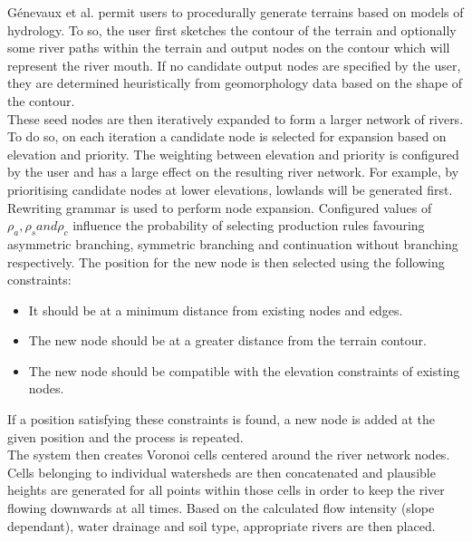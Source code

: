 Génevaux et al. \cite{Genevaux2013} permit users to procedurally generate terrains based on models of hydrology. To so, the user first sketches the contour of the terrain and optionally some river paths within the terrain and output nodes on the contour which will represent the river mouth. If no candidate output nodes are specified by the user, they are determined heuristically from geomorphology data based on the shape of the contour.\\
These seed nodes are then iteratively expanded to form a larger network of rivers. To do so, on each iteration a candidate node is selected for expansion based on elevation and priority. The weighting between elevation and priority is configured by the user and has a large effect on the resulting river network. For example, by prioritising candidate nodes at lower elevations, lowlands will be generated first.\\
Rewriting grammar is used to perform node expansion. Configured values of $\rho_{a}, \rho_{s} and \rho_{c}$ influence the probability of selecting production rules favouring asymmetric branching, symmetric branching and continuation without branching respectively. The position for the new node is then selected using the following constraints:
\begin{itemize}
\item It should be at a minimum distance from existing nodes and edges.
\item The new node should be at a greater distance from the terrain contour.
\item The new node should be compatible with the elevation constraints of existing nodes.
\end{itemize}
If a position satisfying these constraints is found, a new node is added at the given position and the process is repeated.\\
The system then creates Voronoi cells centered around the river network nodes. Cells belonging to individual watersheds are then concatenated and plausible heights are generated for all points within those cells in order to keep the river flowing downwards at all times. Based on the calculated flow intensity (slope dependant), water drainage and soil type, appropriate rivers are then placed.
